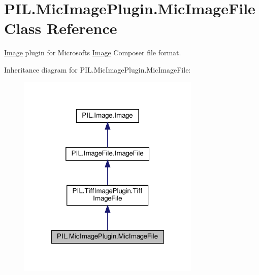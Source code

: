 \hypertarget{classPIL_1_1MicImagePlugin_1_1MicImageFile}{}\section{P\+I\+L.\+Mic\+Image\+Plugin.\+Mic\+Image\+File Class Reference}
\label{classPIL_1_1MicImagePlugin_1_1MicImageFile}


\hyperlink{namespacePIL_1_1Image}{Image} plugin for Microsoft\textquotesingle{}s \hyperlink{namespacePIL_1_1Image}{Image} Composer file format.  




Inheritance diagram for P\+I\+L.\+Mic\+Image\+Plugin.\+Mic\+Image\+File\+:
\nopagebreak
\begin{figure}[H]
\begin{center}
\leavevmode
\includegraphics[width=246pt]{classPIL_1_1MicImagePlugin_1_1MicImageFile__inherit__graph}
\end{center}
\end{figure}


